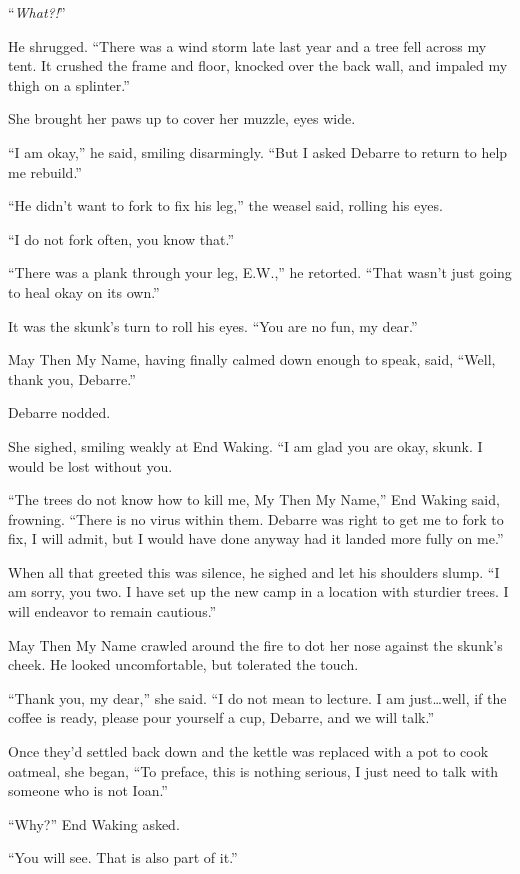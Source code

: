 ``\emph{What?!}''

He shrugged. ``There was a wind storm late last year and a tree fell across my tent. It crushed the frame and floor, knocked over the back wall, and impaled my thigh on a splinter.''

She brought her paws up to cover her muzzle, eyes wide.

``I am okay,'' he said, smiling disarmingly. ``But I asked Debarre to return to help me rebuild.''

``He didn't want to fork to fix his leg,'' the weasel said, rolling his eyes.

``I do not fork often, you know that.''

``There was a plank through your leg, E.W.,'' he retorted. ``That wasn't just going to heal okay on its own.''

It was the skunk's turn to roll his eyes. ``You are no fun, my dear.''

May Then My Name, having finally calmed down enough to speak, said, ``Well, thank you, Debarre.''

Debarre nodded.

She sighed, smiling weakly at End Waking. ``I am glad you are okay, skunk. I would be lost without you.

``The trees do not know how to kill me, My Then My Name,'' End Waking said, frowning. ``There is no virus within them. Debarre was right to get me to fork to fix, I will admit, but I would have done anyway had it landed more fully on me.''

When all that greeted this was silence, he sighed and let his shoulders slump. ``I am sorry, you two. I have set up the new camp in a location with sturdier trees. I will endeavor to remain cautious.''

May Then My Name crawled around the fire to dot her nose against the skunk's cheek. He looked uncomfortable, but tolerated the touch.

``Thank you, my dear,'' she said. ``I do not mean to lecture. I am just\ldots well, if the coffee is ready, please pour yourself a cup, Debarre, and we will talk.''

Once they'd settled back down and the kettle was replaced with a pot to cook oatmeal, she began, ``To preface, this is nothing serious, I just need to talk with someone who is not Ioan.''

``Why?'' End Waking asked.

``You will see. That is also part of it.''

